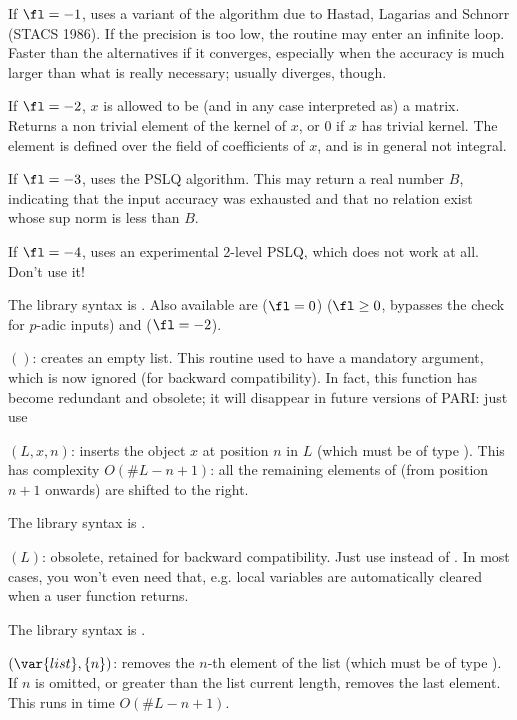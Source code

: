 If $\fl=-1$, uses a variant of the  algorithm due to Hastad,
Lagarias and Schnorr (STACS 1986). If the precision is too low, the routine
may enter an infinite loop. Faster than the alternatives if it converges,
especially when the accuracy is much larger than what is really necessary;
usually diverges, though.

If $\fl=-2$, $x$ is allowed to be (and in any case interpreted as) a matrix.
Returns a non trivial element of the kernel of $x$, or $0$ if $x$ has trivial
kernel. The element is defined over the field of coefficients of $x$, and is
in general not integral.

If $\fl=-3$, uses the PSLQ algorithm. This may return a real number $B$,
indicating that the input accuracy was exhausted and that no relation exist
whose sup norm is less than $B$.

If $\fl=-4$, uses an experimental 2-level PSLQ, which does not work at all.
Don't use it!

The library syntax is .
Also available are  ($\fl=0$)
 ($\fl\geq 0$, bypasses the check for
$p$-adic inputs) and  ($\fl=-2$).

$()$: \label{se:listcreate}creates an empty list. This routine used to have a mandatory argument,
which is now ignored (for backward compatibility). In fact, this function
has become redundant and obsolete; it will disappear in future versions of
PARI: just use 

$(L,x,n)$: \label{se:listinsert}inserts the object $x$ at
position $n$ in $L$ (which must be of type ). This has
complexity $O(\#L - n + 1)$: all the
remaining elements of  (from position $n+1$ onwards) are shifted
to the right.

The library syntax is .

$(L)$: \label{se:listkill}obsolete, retained for backward compatibility. Just use 
instead of . In most cases, you won't even need that, e.g.
local variables are automatically cleared when a user function returns.

The library syntax is .

$(\var{list},\{n\})$: \label{se:listpop}
removes the $n$-th element of the list
 (which must be of type ). If $n$ is omitted,
or greater than the list current length, removes the last element.
This runs in time $O(\#L - n + 1)$.

